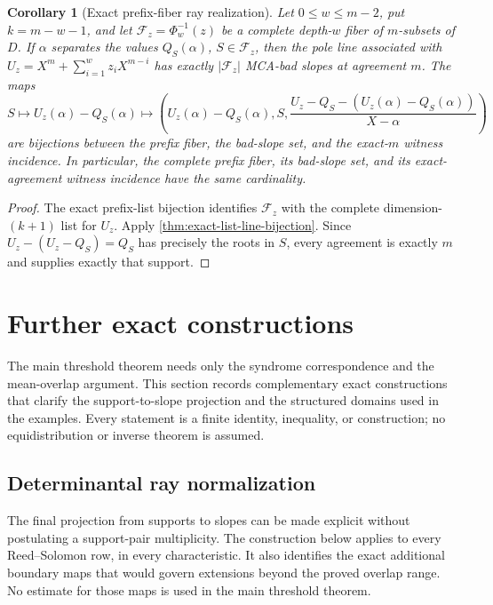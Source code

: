 \documentclass[11pt,a4paper]{amsart}
\numberwithin{equation}{section}
\newtheorem{corollary}[corollary]{Corollary}
\theoremstyle{remark}
\newcommand{\Fcal}{\mathcal F}
\newcommand{\abs}[1]{\lvert #1\rvert}
\begin{document}
\begin{corollary}[Exact prefix-fiber ray realization]
\label{cor:exact-prefix-ray-realization}
Let \(0\le w\le m-2\), put \(k=m-w-1\), and let
\(\Fcal_z=\Phi_w^{-1}(z)\) be a complete depth-\(w\) fiber of
\(m\)-subsets of \(D\).  If \(\alpha\) separates the values
\(Q_S(\alpha)\), \(S\in\Fcal_z\), then the pole line associated with
\(U_z=X^m+\sum_{i=1}^wz_iX^{m-i}\) has exactly
\(\abs{\Fcal_z}\) MCA-bad slopes at agreement \(m\).  The maps
\[
 S\longmapsto U_z(\alpha)-Q_S(\alpha)
 \longmapsto
 \left(U_z(\alpha)-Q_S(\alpha),S,
 \frac{U_z-Q_S-(U_z(\alpha)-Q_S(\alpha))}{X-\alpha}\right)
\]
are bijections between the prefix fiber, the bad-slope set, and the
exact-\(m\) witness incidence.  In particular, the complete prefix fiber,
its bad-slope set, and its exact-agreement witness incidence have the same
cardinality.
\end{corollary}

\begin{proof}
The exact prefix-list bijection identifies \(\Fcal_z\) with the complete
dimension-\((k+1)\) list for \(U_z\).  Apply
\cref{thm:exact-list-line-bijection}.  Since
\(U_z-(U_z-Q_S)=Q_S\) has precisely the roots in \(S\), every agreement
is exactly \(m\) and supplies exactly that support.
\end{proof}



\section{Further exact constructions}\label{sec:further-exact}

The main threshold theorem needs only the syndrome correspondence and the
mean-overlap argument.  This section records complementary exact
constructions that clarify the support-to-slope projection and the
structured domains used in the examples.  Every statement is a finite
identity, inequality, or construction; no equidistribution or inverse
theorem is assumed.

\subsection{Determinantal ray normalization}\label{drc:sec-determinantal-ray}

The final projection from supports to slopes can be made explicit without
postulating a support-pair multiplicity.  The construction below applies to
every Reed--Solomon row, in every characteristic.  It also identifies the
exact additional boundary maps that would govern extensions beyond the
proved overlap range.  No estimate for those maps is used in the main
threshold theorem.
\end{document}
